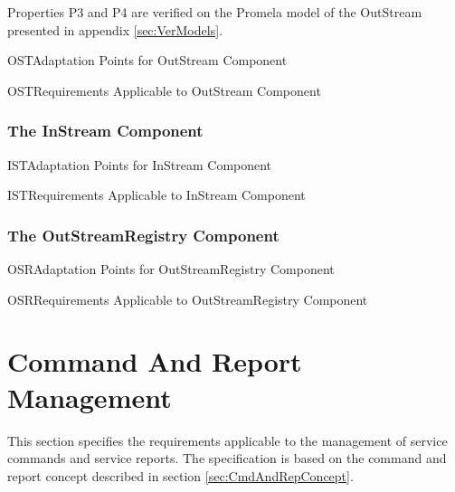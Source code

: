 \documentclass[a4paper,10pt]{article}
\let\stdsection\section
\renewcommand\section{\newpage\stdsection}
\newenvironment{cr_req}[2]
{%
\begin{longtable}{|l|p{9.8cm}|}
\caption{#2} \\
\hline
\rowcolor{light-gray}
\textbf{Req. ID} & \textbf{Requirement Text}\\
\hline\hline
\endfirsthead
\rowcolor{light-gray}
\textbf{Req. ID} & \textbf{Requirement Text}\\
\hline\hline
\endhead
\DTLforeach*[\DTLiseq{\cat}{#1}]{dbReq}{\cat=Category,\type=Type,\id=Id,\reqText=Text}
{\DTLiffirstrow{}{\\\hline}\cat-\id/\type & \textit{\reqText}}\\\hline
}
{\end{longtable}}
\newenvironment{cr_ap}[2]
{%
\begin{longtable}{|l|p{4.7cm}|p{4.9cm}|}
\caption{#2} \\
\hline
\rowcolor{light-gray}
\textbf{AP ID} & \textbf{Adaptation Point} & \textbf{Default Value}\\
\hline\hline
\endfirsthead
\rowcolor{light-gray}
\textbf{AP ID} & \textbf{Adaptation Point} & \textbf{Default Value}\\
\hline\hline
\endhead
\DTLforeach*[\DTLiseq{\cat}{#1}]{dbAP}{\cat=Category,\id=Id,\ap=AP,\defValue=DefValue}
{\DTLiffirstrow{}{\\\hline}\cat-\id & \ap & \defValue}\\\hline
}
{\end{longtable}}
\begin{document}
Properties P3 and P4 are verified on the Promela model of the OutStream presented in appendix \ref{sec:VerModels}. 

\begin{cr_ap}{OST}{Adaptation Points for OutStream Component}
\end{cr_ap}

\begin{cr_req}{OST}{Requirements Applicable to OutStream Component}
\end{cr_req}

\subsubsection{The InStream Component}\label{sec:InStream}


\begin{cr_ap}{IST}{Adaptation Points for InStream Component}
\end{cr_ap}

\pagebreak[4]
\begin{cr_req}{IST}{Requirements Applicable to InStream Component}
\end{cr_req}

\subsubsection{The OutStreamRegistry Component}\label{sec:OutStreamRegistry}


\begin{cr_ap}{OSR}{Adaptation Points for OutStreamRegistry Component}
\end{cr_ap}

\begin{cr_req}{OSR}{Requirements Applicable to OutStreamRegistry Component}
\end{cr_req}


\section{Command And Report Management}\label{sec:CmdAndRepManagement}

This section specifies the requirements applicable to the management of service commands and service reports. The specification is based on the command and report concept described in section \ref{sec:CmdAndRepConcept}. 
\end{document}
